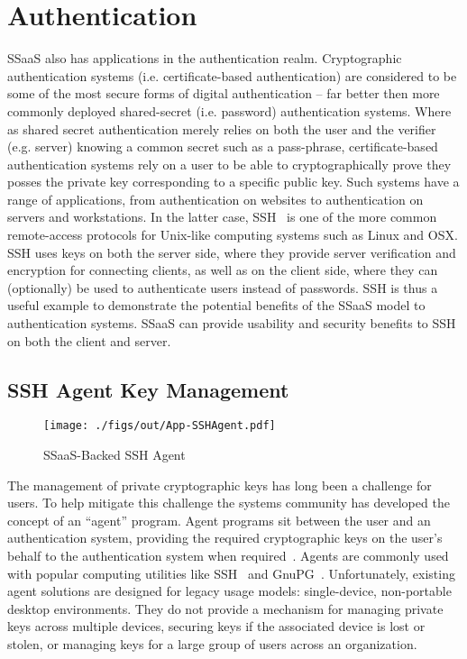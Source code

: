 \section{Authentication}

SSaaS also has applications in the authentication realm. Cryptographic
authentication systems (i.e. certificate-based authentication) are
considered to be some of the most secure forms of digital
authentication -- far better then more commonly deployed shared-secret
(i.e. password) authentication systems. Where as shared secret
authentication merely relies on both the user and the verifier
(e.g. server) knowing a common secret such as a pass-phrase,
certificate-based authentication systems rely on a user to be able to
cryptographically prove they posses the private key corresponding to a
specific public key. Such systems have a range of applications, from
authentication on websites to authentication on servers and
workstations. In the latter case, SSH~\cite{ylonen1996} is one of the
more common remote-access protocols for Unix-like computing systems
such as Linux and OSX. SSH uses keys on both the server side, where
they provide server verification and encryption for connecting
clients, as well as on the client side, where they can (optionally) be
used to authenticate users instead of passwords. SSH is thus a useful
example to demonstrate the potential benefits of the SSaaS model to
authentication systems. SSaaS can provide usability and security
benefits to SSH on both the client and server.

\subsection{SSH Agent Key Management}

\begin{figure}[t]
  \centering
  \texttt{[image: ./figs/out/App-SSHAgent.pdf]}
  \caption{SSaaS-Backed SSH Agent}
  \label{fig:app-sshagent}
\end{figure}

The management of private cryptographic keys has long been a challenge
for users. To help mitigate this challenge the systems community has
developed the concept of an ``agent'' program. Agent programs sit
between the user and an authentication system, providing the required
cryptographic keys on the user's behalf to the authentication system
when required~\cite{cox2002}. Agents are commonly used with popular
computing utilities like SSH~\cite{ylonen1996} and
GnuPG~\cite{gnupg}. Unfortunately, existing agent solutions are
designed for legacy usage models: single-device, non-portable desktop
environments. They do not provide a mechanism for managing private
keys across multiple devices, securing keys if the associated device
is lost or stolen, or managing keys for a large group of users across
an organization.

